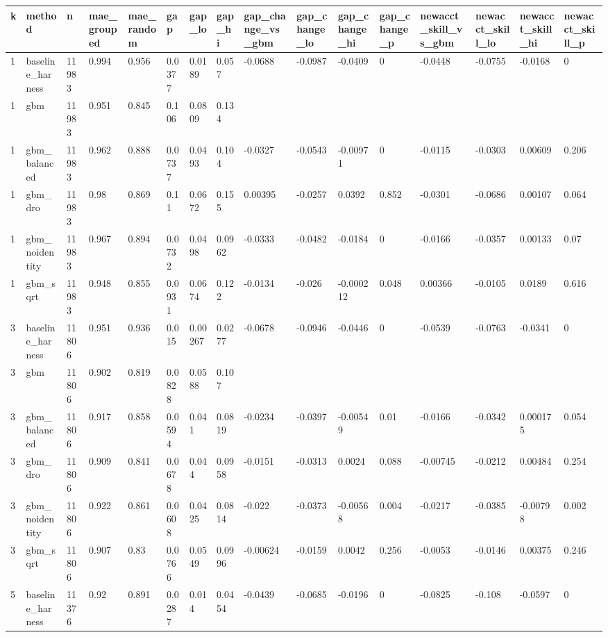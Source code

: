 \begin{tabular}{llllllllllllllll}
\toprule
k & method & n & mae\_grouped & mae\_random & gap & gap\_lo & gap\_hi & gap\_change\_vs\_gbm & gap\_change\_lo & gap\_change\_hi & gap\_change\_p & newacct\_skill\_vs\_gbm & newacct\_skill\_lo & newacct\_skill\_hi & newacct\_skill\_p \\
\midrule
1 & baseline\_harness & 11983 & 0.994 & 0.956 & 0.0377 & 0.0189 & 0.057 & -0.0688 & -0.0987 & -0.0409 & 0 & -0.0448 & -0.0755 & -0.0168 & 0 \\
1 & gbm & 11983 & 0.951 & 0.845 & 0.106 & 0.0809 & 0.134 &  &  &  &  &  &  &  &  \\
1 & gbm\_balanced & 11983 & 0.962 & 0.888 & 0.0737 & 0.0493 & 0.104 & -0.0327 & -0.0543 & -0.00971 & 0 & -0.0115 & -0.0303 & 0.00609 & 0.206 \\
1 & gbm\_dro & 11983 & 0.98 & 0.869 & 0.11 & 0.0672 & 0.155 & 0.00395 & -0.0257 & 0.0392 & 0.852 & -0.0301 & -0.0686 & 0.00107 & 0.064 \\
1 & gbm\_noidentity & 11983 & 0.967 & 0.894 & 0.0732 & 0.0498 & 0.0962 & -0.0333 & -0.0482 & -0.0184 & 0 & -0.0166 & -0.0357 & 0.00133 & 0.07 \\
1 & gbm\_sqrt & 11983 & 0.948 & 0.855 & 0.0931 & 0.0674 & 0.122 & -0.0134 & -0.026 & -0.000212 & 0.048 & 0.00366 & -0.0105 & 0.0189 & 0.616 \\
3 & baseline\_harness & 11806 & 0.951 & 0.936 & 0.015 & 0.00267 & 0.0277 & -0.0678 & -0.0946 & -0.0446 & 0 & -0.0539 & -0.0763 & -0.0341 & 0 \\
3 & gbm & 11806 & 0.902 & 0.819 & 0.0828 & 0.0588 & 0.107 &  &  &  &  &  &  &  &  \\
3 & gbm\_balanced & 11806 & 0.917 & 0.858 & 0.0594 & 0.041 & 0.0819 & -0.0234 & -0.0397 & -0.00549 & 0.01 & -0.0166 & -0.0342 & 0.000175 & 0.054 \\
3 & gbm\_dro & 11806 & 0.909 & 0.841 & 0.0678 & 0.044 & 0.0958 & -0.0151 & -0.0313 & 0.0024 & 0.088 & -0.00745 & -0.0212 & 0.00484 & 0.254 \\
3 & gbm\_noidentity & 11806 & 0.922 & 0.861 & 0.0608 & 0.0425 & 0.0814 & -0.022 & -0.0373 & -0.00568 & 0.004 & -0.0217 & -0.0385 & -0.00798 & 0.002 \\
3 & gbm\_sqrt & 11806 & 0.907 & 0.83 & 0.0766 & 0.0549 & 0.0996 & -0.00624 & -0.0159 & 0.0042 & 0.256 & -0.0053 & -0.0146 & 0.00375 & 0.246 \\
5 & baseline\_harness & 11376 & 0.92 & 0.891 & 0.0287 & 0.014 & 0.0454 & -0.0439 & -0.0685 & -0.0196 & 0 & -0.0825 & -0.108 & -0.0597 & 0 \\

\end{tabular}

